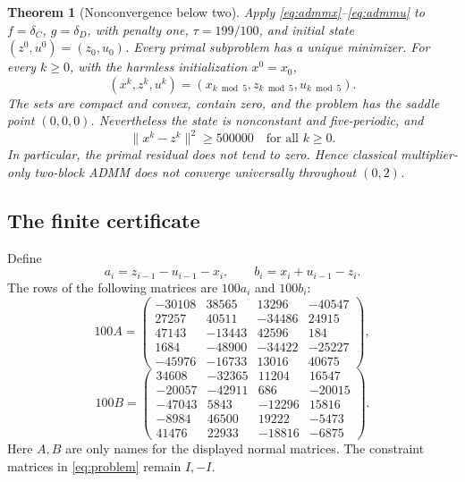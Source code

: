 \documentclass[11pt,a4paper]{article}
\newtheorem{theorem}{Theorem}
\theoremstyle{remark}
\newcommand{\norm}[1]{\lVert #1\rVert}
\begin{document}
\begin{theorem}[Nonconvergence below two]\label{thm:main}
Apply \eqref{eq:admmx}--\eqref{eq:admmu} to $f=\delta_C$, $g=\delta_D$, with penalty one, $\tau=199/100$, and initial state $(z^0,u^0)=(z_0,u_0)$. Every primal subproblem has a unique minimizer. For every $k\ge0$, with the harmless initialization $x^0=x_0$,
\[
(x^k,z^k,u^k)=(x_{k\bmod5},z_{k\bmod5},u_{k\bmod5}).
\]
The sets are compact and convex, contain zero, and the problem has the saddle point $(0,0,0)$. Nevertheless the state is nonconstant and five-periodic, and
\[
\norm{x^k-z^k}^2\ge 500000\quad\text{for all }k\ge0.
\]
In particular, the primal residual does not tend to zero. Hence classical multiplier-only two-block ADMM does not converge universally throughout $(0,2)$.
\end{theorem}

\subsection{The finite certificate}
Define
\begin{equation}\label{eq:normals}
a_i=z_{i-1}-u_{i-1}-x_i,\qquad b_i=x_i+u_{i-1}-z_i.
\end{equation}
The rows of the following matrices are $100a_i$ and $100b_i$:
\begin{equation}\label{eq:normalA}
100A=\begin{pmatrix}
-30108&38565&13296&-40547\\27257&40511&-34486&24915\\47143&-13443&42596&184\\1684&-48900&-34422&-25227\\-45976&-16733&13016&40675
\end{pmatrix},
\end{equation}
\begin{equation}\label{eq:normalB}
100B=\begin{pmatrix}
34608&-32365&11204&16547\\-20057&-42911&686&-20015\\-47043&5843&-12296&15816\\-8984&46500&19222&-5473\\41476&22933&-18816&-6875
\end{pmatrix}.
\end{equation}
Here $A,B$ are only names for the displayed normal matrices. The constraint matrices in \eqref{eq:problem} remain $I,-I$.
\end{document}
